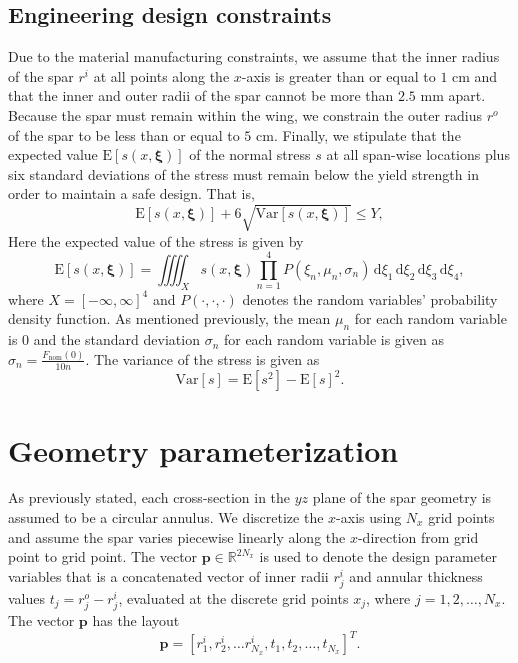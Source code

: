 \documentclass[10pt]{article}
\newcommand{\bs}[1] {\boldsymbol{#1}}
\begin{document}
\subsection{Engineering design constraints}

Due to the material manufacturing constraints, we assume
that the inner radius of the spar $r^i$ at all points
along the $x$-axis is greater than or equal to $1$ cm
and that the inner and outer radii of the spar cannot
be more than $2.5$ mm apart. Because the spar must
remain within the wing, we constrain the outer radius
$r^o$ of the spar to be less than or equal to $5$ cm.
Finally, we stipulate that the expected value
$\text{E}[s(x, \bs{\xi})]$  of
the normal stress $s$ at all span-wise locations
plus six standard
deviations of the stress must remain below the yield
strength in order to maintain a safe design. That is,
%
\begin{equation}
\text{E} [ s(x, \bs{\xi}) ] + 6 \sqrt{\text{Var}[s(x, \bs{\xi})]}
\leq Y,
\end{equation}
%
Here the expected value of the stress is given by
%
\begin{equation}
\text{E}[ s(x, \bs{\xi}) ] =
\iiiint _{X} s(x, \bs{\xi}) \prod_{n=1}^{4} P(\xi_n, \mu_n, \sigma_n)
\, \text{d} \xi_1
\, \text{d} \xi_2
\, \text{d} \xi_3
\, \text{d} \xi_4,
\label{eq:expected}
\end{equation}
%
where $X = [-\infty,\infty]^4$ and $P(\cdot,\cdot,\cdot)$ denotes
the random variables' probability density function.
As mentioned previously, the mean $\mu_n$ for each random variable
is $0$ and
the standard deviation $\sigma_n$ for each random variable
is given as $\sigma_n = \frac{F_{\text{nom}}(0)}{10n}$.
The variance of the stress is given as
%
\begin{equation}
\text{Var}[s] = \text{E}[s^2] - \text{E}[s]^2.
\end{equation}

\section{Geometry parameterization}

As previously stated, each cross-section in the $yz$
plane of the spar geometry is assumed to be a circular
annulus. We discretize the $x$-axis using $N_x$
grid points and assume the spar varies piecewise
linearly along the $x$-direction from grid point
to grid point. The vector $\bs{p} \in \mathbb{R}^{2 N_x}$
is used to denote the design parameter variables that
is a concatenated vector of inner radii $r^i_j$
and annular thickness values $t_j = r^o_j - r^i_j$,
evaluated at the discrete grid points $x_j$,
where $j=1,2,\dots,N_x$. The vector $\bs{p}$ has the
layout
%
\begin{equation}
\bs{p} = [r^i_1, r^i_2, \dots r^i_{N_x}, t_1, t_2, \dots, t_{N_x}]^T.
\end{equation}
\end{document}
